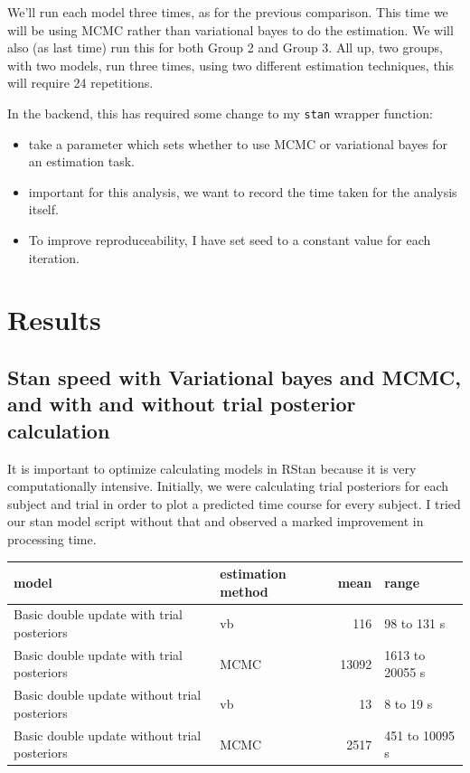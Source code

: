 \documentclass[]{article}
\providecommand{\tightlist}{%
  \setlength{\itemsep}{0pt}\setlength{\parskip}{0pt}}
\begin{document}
We'll run each model three times, as for the previous comparison. This
time we will be using MCMC rather than variational bayes to do the
estimation. We will also (as last time) run this for both Group 2 and
Group 3. All up, two groups, with two models, run three times, using two
different estimation techniques, this will require 24 repetitions.

In the backend, this has required some change to my \texttt{stan}
wrapper function:

\begin{itemize}
\tightlist
\item
  take a parameter which sets whether to use MCMC or variational bayes
  for an estimation task.
\item
  important for this analysis, we want to record the time taken for the
  analysis itself.
\item
  To improve reproduceability, I have set seed to a constant value for
  each iteration.
\end{itemize}

\section{Results}\label{results}

\subsection{Stan speed with Variational bayes and MCMC, and with and
without trial posterior
calculation}\label{stan-speed-with-variational-bayes-and-mcmc-and-with-and-without-trial-posterior-calculation}

It is important to optimize calculating models in RStan because it is
very computationally intensive. Initially, we were calculating trial
posteriors for each subject and trial in order to plot a predicted time
course for every subject. I tried our stan model script without that and
observed a marked improvement in processing time.

\begin{longtable}[]{@{}llrl@{}}
\toprule
model & estimation method & mean & range\tabularnewline
\midrule
\endhead
Basic double update with trial posteriors & vb & 116 & 98 to 131
s\tabularnewline
Basic double update with trial posteriors & MCMC & 13092 & 1613 to 20055
s\tabularnewline
Basic double update without trial posteriors & vb & 13 & 8 to 19
s\tabularnewline
Basic double update without trial posteriors & MCMC & 2517 & 451 to
10095 s\tabularnewline
\bottomrule
\end{longtable}
\end{document}
